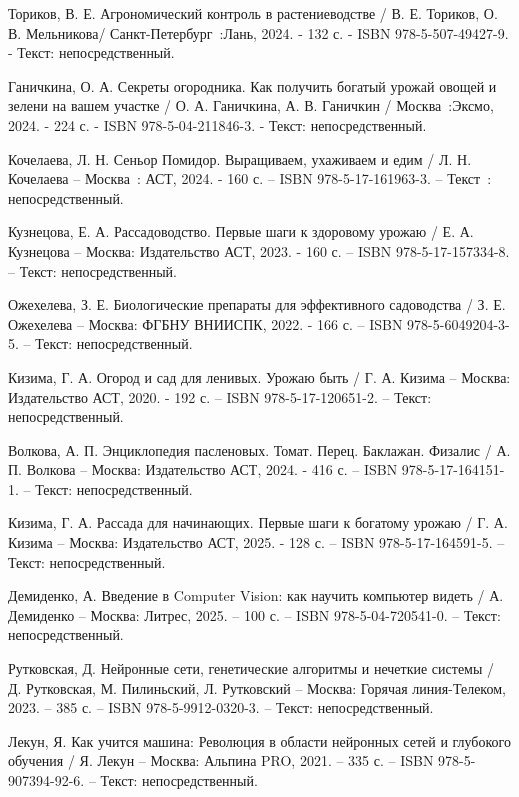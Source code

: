 \begin{thebibliography}{9}
	 Ториков, В. Е. Агрономический контроль в растениеводстве / В. Е. Ториков, О. В. Мельникова/ Санкт-Петербург~:Лань, 2024. - 132 с. - ISBN 978-5-507-49427-9. - Текст: непосредственный.
	
	 Ганичкина, О. А. Секреты огородника. Как получить богатый урожай овощей и зелени на вашем участке / О. А. Ганичкина, А. В. Ганичкин  / Москва~:Эксмо, 2024. - 224 с. - ISBN 978-5-04-211846-3. - Текст: непосредственный.
	
	 Кочелаева, Л. Н. Сеньор Помидор. Выращиваем, ухаживаем и едим / Л. Н. Кочелаева  – Москва~: АСТ, 2024. - 160 с. – ISBN 978-5-17-161963-3. – Текст~: непосредственный.	
	
	 Кузнецова, Е. А. Рассадоводство. Первые шаги к здоровому урожаю / Е. А. Кузнецова – Москва: Издательство АСТ, 2023. - 160 с. – ISBN 978-5-17-157334-8. – Текст: непосредственный.
	
	 Ожехелева, З. Е. Биологические препараты для эффективного садоводства / З. Е. Ожехелева – Москва: ФГБНУ ВНИИСПК, 2022. - 166 с. – ISBN 978-5-6049204-3-5. – Текст: непосредственный.
	
	 Кизима, Г. А. Огород и сад для ленивых. Урожаю быть / Г. А. Кизима – Москва: Издательство АСТ, 2020. - 192 с. – ISBN 978-5-17-120651-2. – Текст: непосредственный.
	
	 Волкова, А. П. Энциклопедия пасленовых. Томат. Перец. Баклажан. Физалис / А. П. Волкова – Москва: Издательство АСТ, 2024. - 416 с. – ISBN 978-5-17-164151-1. – Текст: непосредственный.
	
	 Кизима, Г. А. Рассада для начинающих. Первые шаги к богатому урожаю / Г. А. Кизима – Москва: Издательство АСТ, 2025. - 128 с. – ISBN 978-5-17-164591-5. – Текст: непосредственный.
	
	 Демиденко, А. Введение в Computer Vision: как научить компьютер видеть / А. Демиденко – Москва: Литрес, 2025. – 100 с. – ISBN 978-5-04-720541-0. – Текст: непосредственный.
	
	 Рутковская, Д. Нейронные сети, генетические алгоритмы и нечеткие системы / Д. Рутковская, М. Пилиньский, Л. Рутковский – Москва: Горячая линия-Телеком, 2023. – 385 с. – ISBN 978-5-9912-0320-3. – Текст: непосредственный.
	
	 Лекун, Я. Как учится машина: Революция в области нейронных сетей и глубокого обучения / Я. Лекун – Москва: Альпина PRO, 2021. – 335 с. – ISBN 978-5-907394-92-6. – Текст: непосредственный.
	

\end{thebibliography}
